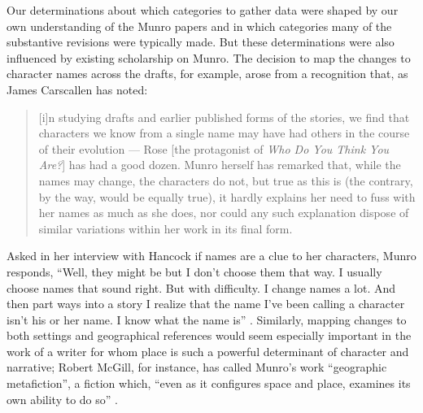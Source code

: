 \documentclass{article}
\begin{document}
Our determinations about which categories to gather data were shaped by
our own understanding of the Munro papers and in which categories many
of the substantive revisions were typically made. But these
determinations were also influenced by existing scholarship on Munro.
The decision to map the changes to character names across the drafts,
for example, arose from a recognition that, as James Carscallen has
noted:

\begin{quote}
{[}i{]}n studying drafts and earlier published forms of the stories, we
find that characters we know from a single name may have had others in the course of their evolution –– Rose {[}the protagonist of \emph{Who Do You Think You
Are?}{]} has had a good dozen. Munro herself has remarked that, while
the names may change, the characters do not, but true as this is (the contrary, by the way, would be equally true), it hardly explains her need to fuss with her names as much as she does, nor could any such
explanation dispose of similar variations within her work in its final
form. 

\begin{flushright}
    \parencite[85--86]{carscallen_other_1992}
\end{flushright}
\end{quote}

Asked in her interview with Hancock if names are a clue to her
characters, Munro responds, ``Well, they might be but I don't choose
them that way. I usually choose names that sound right. But with
difficulty. I change names a lot. And then part ways into a story I
realize that the name I've been calling a character isn't his or her
name. I know what the name is'' \citep[101]{hancock_interview_1982}. Similarly, mapping
changes to both settings and geographical references would seem
especially important in the work of a writer for whom place is such a
powerful determinant of character and narrative; Robert McGill, for
instance, has called Munro's work ``geographic metafiction'', a fiction
which, ``even as it configures space and place, examines its own ability
to do so'' \citep[103]{mcgill_where_2002}.
\end{document}
